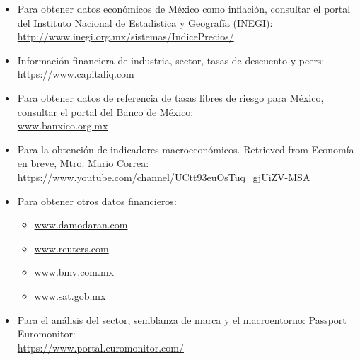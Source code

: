 \begin{itemize}

	\item Para obtener datos econ\'omicos de M\'exico como inflaci\'on, consultar el portal del Instituto Nacional de Estad\'istica y Geograf\'ia (INEGI):\\
	 \url{http://www.inegi.org.mx/sistemas/IndicePrecios/}

	\item Informaci\'on financiera de industria, sector, tasas de descuento y peers: \\
	\url{https://www.capitaliq.com}

	\item Para obtener datos de referencia de tasas libres de riesgo para M\'exico, consultar el portal del Banco de M\'exico:\\
\href{http://www.banxico.org.mx/SieInternet/consultarDirectorioInternetAction.do?accion=consultarCuadro&idCuadro=CF114&sector=18&locale=es}{www.banxico.org.mx}

	\item Para la obtenci\'on de indicadores macroecon\'omicos. Retrieved from Econom\'ia en breve, Mtro. Mario Correa:\\
	 \url{https://www.youtube.com/channel/UCtt93euOsTuq_gjUiZV-MSA}

	\item Para obtener otros datos financieros:
	\begin{itemize}

		\item \url{www.damodaran.com}
		\item \url{www.reuters.com}
		\item \url{www.bmv.com.mx}
		\item \url{www.sat.gob.mx}
	\end{itemize}
	\item Para el an\'alisis del sector, semblanza de marca y el macroentorno:
	Passport Euromonitor:\\
	 \url{https://www.portal.euromonitor.com/}
	 
\end{itemize}